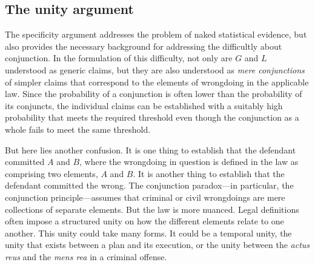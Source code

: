 \documentclass[
  10pt,
  dvipsnames,enabledeprecatedfontcommands]{scrartcl}
\begin{document}
\hypertarget{the-unity-argument}{%
\subsection{The unity argument}\label{the-unity-argument}}

The specificity argument addresses the problem of naked statistical
evidence, but also provides the necessary background for addressing the
difficultly about conjunction. In the formulation of this difficulty,
not only are \(G\) and \(L\) understood as generic claims, but they are
also understood as \emph{mere conjunctions} of simpler claims that
correspond to the elements of wrongdoing in the applicable law. Since
the probability of a conjunction is often lower than the probability of
its conjuncts, the individual claims can be established with a suitably
high probability that meets the required threshold even though the
conjunction as a whole fails to meet the same threshold.

But here lies another confusion. It is one thing to establish that the
defendant committed \(A\) and \(B\), where the wrongdoing in question is
defined in the law as comprising two elements, \(A\) and \(B\). It is
another thing to establish that the defendant committed the wrong. The
conjunction paradox---in particular, the conjunction principle---assumes
that criminal or civil wrongdoings are mere collections of separate
elements. But the law is more nuanced. Legal definitions often impose a
structured unity on how the different elements relate to one another.
This unity could take many forms. It could be a temporal unity, the
unity that exists between a plan and its execution, or the unity between
the \textit{actus reus} and the \textit{mens rea} in a criminal offense.
\end{document}
